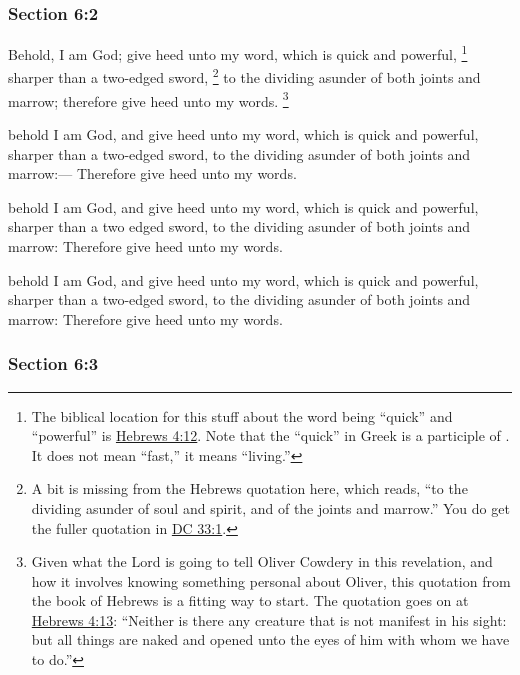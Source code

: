 	\subsubsection{Section 6:2} %
		\label{DC6-2}

		Behold, I am God; give heed unto my word, which is quick and powerful,%
			\footnote{%
				The biblical location for this stuff about the word being ``quick'' and ``powerful'' is \hyperref[HEBREWS-4-12]{Hebrews 4:12}. Note that the ``quick'' in Greek is a participle of . It does not mean ``fast,'' it means ``living.'' 
				}
		sharper than a two-edged sword,
			\footnote{%
				A bit is missing from the Hebrews quotation here, which reads, ``to the dividing asunder of soul and spirit, and of the joints and marrow.'' You do get the fuller quotation in \hyperref[DC33-1]{DC 33:1}.
				}%
		to the dividing asunder of both joints and marrow; therefore give heed unto my words.%
		\footnote{%
			Given what the Lord is going to tell Oliver Cowdery in this revelation, and how it involves knowing something personal about Oliver, this quotation from the book of Hebrews is a fitting way to start. The quotation goes on at \hyperref[HEBREWS-4-13]{Hebrews 4:13}: ``Neither is there any creature that is not manifest in his sight: but all things are naked and opened unto the eyes of him with whom we have to do.''
			}

		\begin{framed}
		\scriptsize
			\begin{compactdesc}
				\item[JSP] behold I am God, and give heed unto my word, which is quick and powerful, sharper than a two-edged sword, to the dividing asunder of both joints and marrow:--- Therefore give heed unto my words.
				\item[DC 1835] behold I am God, and give heed unto my word, which is quick and powerful, sharper than a two edged sword, to the dividing asunder of both joints and marrow: Therefore give heed unto my words.
				\item[DC 1844] behold I am God, and give heed unto my word, which is quick and powerful, sharper than a two-edged sword, to the dividing asunder of both joints and marrow: Therefore give heed unto my words.
			\end{compactdesc}
		\end{framed}

	\subsubsection{Section 6:3} %
		\label{DC6-3}

